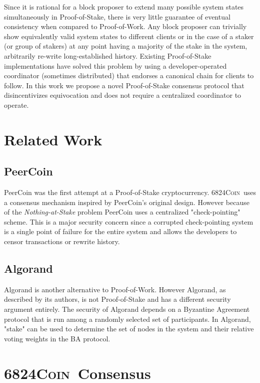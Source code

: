 \documentclass{article}
\newcommand{\coin}{ \textsc{6824Coin}\ }
\begin{document}
Since it is rational for a block proposer to extend many possible system states simultaneously in Proof-of-Stake, there is very little guarantee of eventual consistency when compared to Proof-of-Work. Any block proposer can trivially show equivalently valid system states to different clients or in the case of a staker (or group of stakers) at any point having a majority of the stake in the system, arbitrarily re-write long-established history. Existing Proof-of-Stake implementations have solved this problem by using a developer-operated coordinator (sometimes distributed) that endorses a canonical chain for clients to follow. In this work we propose a novel Proof-of-Stake consensus protocol that disincentivizes equivocation and does not require a centralized coordinator to operate. 

\section{Related Work}

\subsection{PeerCoin}
PeerCoin \cite{peercoin} was the first attempt at a Proof-of-Stake cryptocurrency. \coin uses a consensus mechanism inspired by PeerCoin's original design. However because of the \textit{Nothing-at-Stake} problem PeerCoin uses a centralized "check-pointing" scheme. This is a major security concern since a corrupted check-pointing system is a single point of failure for the entire system and allows the developers to censor transactions or rewrite history.

\subsection{Algorand}
Algorand \cite{algorand} is another alternative to Proof-of-Work. However Algorand, as described by its authors, is not Proof-of-Stake and has a different security argument entirely. The security of Algorand depends on a Byzantine Agreement protocol that is run among a randomly selected set of participants. In Algorand, "stake" can be used to determine the set of nodes in the system and their relative voting weights in the BA protocol.

\section{\coin Consensus}
\end{document}
